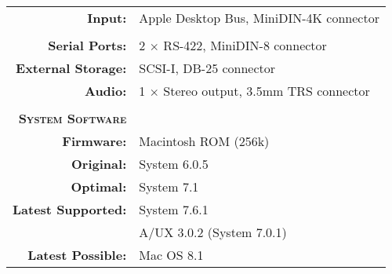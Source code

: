 \begin{tabular}{ r p{6in} }
\\
\textbf{Input:} & Apple Desktop Bus, MiniDIN-4K connector \\
\\
\textbf{Serial Ports:} & 2 \(\times\) RS-422, MiniDIN-8 connector \\
\textbf{External Storage:} & SCSI-I, DB-25 connector \\
\textbf{Audio:} & 1 \(\times\) Stereo output, 3.5mm TRS connector \\
\\
\textbf{\textsc{System Software}} & ~ \\
\textbf{Firmware:} & Macintosh ROM (256k) \\
\textbf{Original:} & System 6.0.5 \\
\textbf{Optimal:} & System 7.1 \\
\textbf{Latest Supported:} & System 7.6.1 \\
~ & A/UX 3.0.2 (System 7.0.1) \\
\textbf{Latest Possible:} & Mac OS 8.1 \\
\end{tabular}
